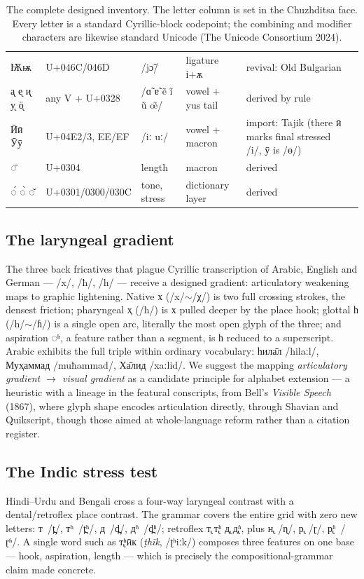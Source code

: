 \documentclass[11pt]{article}
\newcommand{\cz}[1]{{\chu #1}}
\newcommand{\ph}[1]{{\ipafont/#1/}}
\begin{document}
\begin{table}[ht]
\begin{tabular}{llllll}
\cz{Ѭѭ} & U+046C/046D & \ph{jɔ̃} & ligature і+ѫ & revival: Old Bulgarian \\
\cz{а̨ е̨ и̨ у̨ ӧ̨} & any V + U+0328 & \ph{ɑ̃ ɐ̃ ẽ ĩ ũ œ̃} & vowel + yus tail & derived by rule \\
\cz{Ӣӣ Ӯӯ} & U+04E2/3, EE/EF & \ph{iː uː} & vowel + macron & import: Tajik (there ӣ marks final stressed \ph{i}, ӯ is \ph{ɵ}) \\
\cz{◌̄} & U+0304 & length & macron & derived \\
\cz{◌́ ◌̀ ◌̌} & U+0301/0300/030C & tone, stress & dictionary layer & derived \\
\bottomrule
\end{tabular}
\caption{The complete designed inventory. The letter column is set in the Chuzhditsa face. Every letter is a standard Cyrillic-block codepoint; the combining and modifier characters are likewise standard Unicode (The Unicode Consortium 2024).}
\label{tab:inventory}
\end{table}

\subsection{The laryngeal gradient}
The three back fricatives that plague Cyrillic transcription of Arabic, English and German — \ph{x}, \ph{ħ}, \ph{h} — receive a designed gradient: articulatory weakening maps to graphic lightening. Native \cz{х} (\ph{x}$\sim$\ph{χ}) is two full crossing strokes, the densest friction; pharyngeal \cz{ҳ} (\ph{ħ}) is \cz{х} pulled deeper by the place hook; glottal \cz{һ} (\ph{h}$\sim$\ph{ɦ}) is a single open arc, literally the most open glyph of the three; and aspiration \cz{◌ʰ}, a feature rather than a segment, is \cz{һ} reduced to a superscript. Arabic exhibits the full triple within ordinary vocabulary: \cz{һила̄л} \ph{hilaːl}, \cz{Муҳаммад} \ph{muħammad}, \cz{Ха̄лид} \ph{xaːlid}. We suggest the mapping \emph{articulatory gradient $\rightarrow$ visual gradient} as a candidate principle for alphabet extension — a heuristic with a lineage in the featural conscripts, from Bell's \emph{Visible Speech} (1867), where glyph shape encodes articulation directly, through Shavian and Quikscript, though those aimed at whole-language reform rather than a citation register.

\subsection{The Indic stress test}
Hindi--Urdu and Bengali cross a four-way laryngeal contrast with a dental/retroflex place contrast. The grammar covers the entire grid with zero new letters: \cz{т}~\ph{t̪}, \cz{тʰ}~\ph{t̪ʰ}, \cz{д}~\ph{d̪}, \cz{дʱ}~\ph{d̪ʱ}; retroflex \cz{т̢ т̢ʰ д̢ д̢ʱ}, plus \cz{н̢}~\ph{ɳ}, \cz{р̢}~\ph{ɽ}, \cz{р̢ʱ}~\ph{ɽʱ}. A single word such as \cz{т̢ʰӣк} (\emph{ṭhīk}, \ph{ʈʰiːk}) composes three features on one base — hook, aspiration, length — which is precisely the compositional-grammar claim made concrete.
\end{document}
